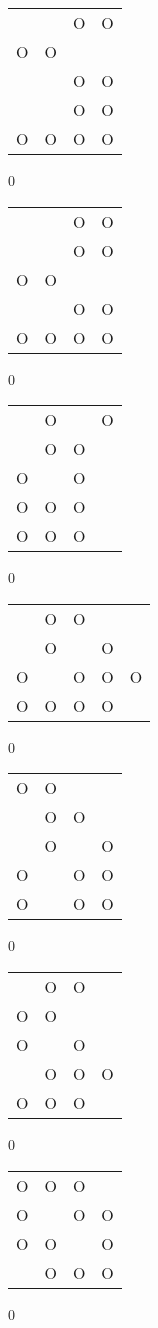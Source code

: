 \begin{tabular}{|m{0.2cm}m{0.2cm}m{0.2cm}m{0.2cm}|}\hline
 & &O&O\\
O&O& & \\
 & &O&O\\
 & &O&O\\
O&O&O&O\\
\hline\end{tabular}0
\begin{tabular}{|m{0.2cm}m{0.2cm}m{0.2cm}m{0.2cm}|}\hline
 & &O&O\\
 & &O&O\\
O&O& & \\
 & &O&O\\
O&O&O&O\\
\hline\end{tabular}0
\begin{tabular}{|m{0.2cm}m{0.2cm}m{0.2cm}m{0.2cm}|}\hline
 &O& &O\\
 &O&O& \\
O& &O& \\
O&O&O& \\
O&O&O& \\
\hline\end{tabular}0
\begin{tabular}{|m{0.2cm}m{0.2cm}m{0.2cm}m{0.2cm}m{0.2cm}|}\hline
 &O&O& & \\
 &O& &O& \\
O& &O&O&O\\
O&O&O&O& \\
\hline\end{tabular}0
\begin{tabular}{|m{0.2cm}m{0.2cm}m{0.2cm}m{0.2cm}|}\hline
O&O& & \\
 &O&O& \\
 &O& &O\\
O& &O&O\\
O& &O&O\\
\hline\end{tabular}0
\begin{tabular}{|m{0.2cm}m{0.2cm}m{0.2cm}m{0.2cm}|}\hline
 &O&O& \\
O&O& & \\
O& &O& \\
 &O&O&O\\
O&O&O& \\
\hline\end{tabular}0
\begin{tabular}{|m{0.2cm}m{0.2cm}m{0.2cm}m{0.2cm}|}\hline
O&O&O& \\
O& &O&O\\
O&O& &O\\
 &O&O&O\\
\hline\end{tabular}0
